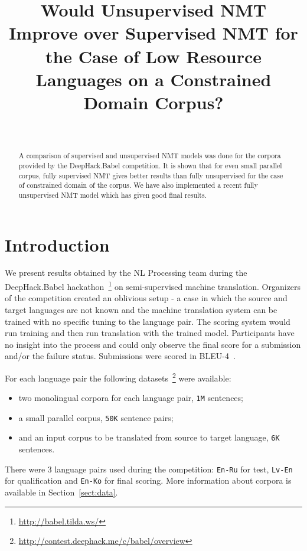 \documentclass[]{article}
\begin{document}
\title{\bf Would Unsupervised NMT Improve over Supervised NMT for the Case of Low Resource Languages on a Constrained Domain Corpus?}
\author{ \hfill  {}\\
\AND
         \hfill {}
}

\maketitle
\pagestyle{empty}

\begin{abstract}
  A comparison of supervised and unsupervised NMT models was done for the corpora provided by the DeepHack.Babel competition.
  It is shown that for even small parallel corpus, fully supervised NMT gives better results than fully unsupervised for the case of constrained domain of the corpus.
  We have also implemented a recent fully unsupervised NMT model which has given good final results.
\end{abstract}

\section{Introduction}
\label{sect:intro}

We present results obtained by the NL Processing team during the DeepHack.Babel hackathon~\footnote{\url{http://babel.tilda.ws/}} on semi-supervised machine translation.
Organizers of the competition created an oblivious setup - a case in which the source and target languages are not known and the machine translation system can be trained with no specific tuning to the language pair.
The scoring system would run training and then run translation with the trained model.
Participants have no insight into the process and could only observe the final score for a submission and/or the failure status.
Submissions were scored in BLEU-4~\citep{papineni2002bleu}.

For each language pair the following datasets~\footnote{\url{http://contest.deephack.me/c/babel/overview}} were available:
\begin{itemize}
  \item two monolingual corpora for each language pair, {\tt 1M} sentences;
  \item a small parallel corpus, {\tt 50K} sentence pairs;
  \item and an input corpus to be translated from source to target language, {\tt 6K} sentences.
\end{itemize}
There were 3 language pairs used during the competition: {\tt En-Ru} for test, {\tt Lv-En} for qualification and {\tt En-Ko} for final scoring.
More information about corpora is available in Section~\ref{sect:data}.
\end{document}
